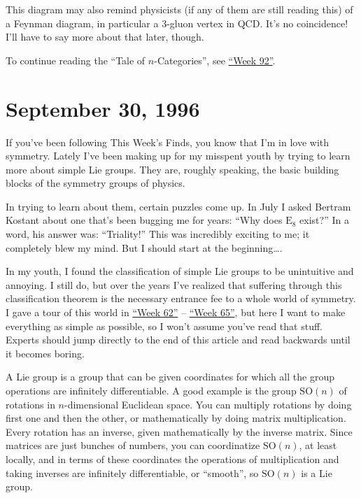 \documentclass{article}
\begin{document}
This diagram may also remind physicists (if any of them are still
reading this) of a Feynman diagram, in particular a 3-gluon vertex in
QCD. It's no coincidence! I'll have to say more about that later,
though.

To continue reading the ``Tale of \(n\)-Categories'', see
\protect\hyperlink{week92}{``Week 92''}.
\hypertarget{week90}{%
\section{September 30, 1996}\label{week90}}

If you've been following This Week's Finds, you know that I'm in love
with symmetry. Lately I've been making up for my misspent youth by
trying to learn more about simple Lie groups. They are, roughly
speaking, the basic building blocks of the symmetry groups of physics.

In trying to learn about them, certain puzzles come up. In July I asked
Bertram Kostant about one that's been bugging me for years: ``Why does
\(\mathrm{E}_8\) exist?'' In a word, his answer was: ``Triality!'' This
was incredibly exciting to me; it completely blew my mind. But I should
start at the beginning\ldots.

In my youth, I found the classification of simple Lie groups to be
unintuitive and annoying. I still do, but over the years I've realized
that suffering through this classification theorem is the necessary
entrance fee to a whole world of symmetry. I gave a tour of this world
in \protect\hyperlink{week62}{``Week 62''} --
\protect\hyperlink{week65}{``Week 65''}, but here I want to make
everything as simple as possible, so I won't assume you've read that
stuff. Experts should jump directly to the end of this article and read
backwards until it becomes boring.

A Lie group is a group that can be given coordinates for which all the
group operations are infinitely differentiable. A good example is the
group \(\mathrm{SO}(n)\) of rotations in \(n\)-dimensional Euclidean
space. You can multiply rotations by doing first one and then the other,
or mathematically by doing matrix multiplication. Every rotation has an
inverse, given mathematically by the inverse matrix. Since matrices are
just bunches of numbers, you can coordinatize \(\mathrm{SO}(n)\), at
least locally, and in terms of these coordinates the operations of
multiplication and taking inverses are infinitely differentiable, or
``smooth'', so \(\mathrm{SO}(n)\) is a Lie group.
\end{document}
